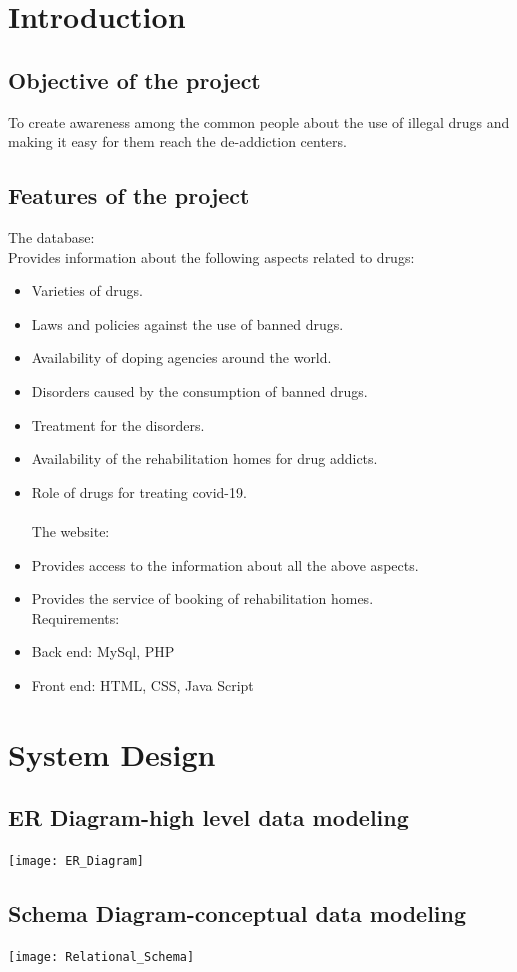 \documentclass{report}
\begin{document}
\tableofcontents
\chapter{Introduction}
\section{Objective of the project}
To create awareness among the common people about the use of illegal drugs and making it easy for them reach the de-addiction centers.
\section{Features of the project}  
The database:\\
Provides information about the following aspects related to drugs:
\begin{itemize}
\item Varieties of drugs.
\item Laws and policies against the use of banned drugs.
\item Availability of doping agencies around the world.
\item Disorders caused by the consumption of banned drugs.
\item Treatment for the disorders.
\item Availability of the rehabilitation homes for drug addicts. 
\item Role of drugs for treating covid-19.\\
\\
The website:
\item Provides access to the information about all the above aspects. 
\item Provides the service of booking of rehabilitation homes.
\\
Requirements:
\item Back end: MySql, PHP
\item Front end: HTML, CSS, Java Script 
\end{itemize}
\chapter{System Design}
\section{ER Diagram-high level data modeling}
\centerline{\texttt{[image: ER\_Diagram]}}
\section{Schema Diagram-conceptual data modeling}
\centerline{\texttt{[image: Relational\_Schema]}}
\end{document}
